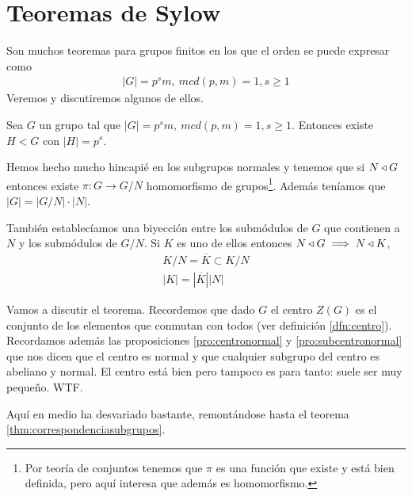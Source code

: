 
\chapter{Teoremas de Sylow}


Son muchos teoremas para grupos finitos en los que el orden se puede expresar como
\begin{align}
	|G| = p^s m,\ mcd(p, m) = 1, s \geq 1
\end{align}
Veremos y discutiremos algunos de ellos.

\begin{thm}
	Sea $G$ un grupo tal que $|G| = p^s m,\ mcd(p, m) = 1, s \geq 1$. Entonces existe $H < G$ con $|H| = p^s$.
\end{thm}

Hemos hecho mucho hincapié en los subgrupos normales y tenemos que si $N \mathbin{\triangleleft} G$ entonces existe $\pi:G \to G/N$ homomorfismo de grupos\footnote{Por teoría de conjuntos tenemos que $\pi$ es una función que existe y está bien definida, pero aquí interesa que además es homomorfismo.}. Además teníamos que $|G| = |G/N| \cdot |N|$.

También establecíamos una biyección entre los submódulos de $G$ que contienen a $N$ y los submódulos de $G/N$. Si $K$ es uno de ellos entonces $N \mathbin{\triangleleft} G \implies N \mathbin{\triangleleft} K$,
\begin{align*}
	K/N = \overline{K} \subset K/N \\
	|K| = |\overline{K}||N|
\end{align*}

Vamos a discutir el teorema. Recordemos que dado $G$ el centro $Z(G)$ es el conjunto de los elementos que conmutan con todos (ver definición \ref{dfn:centro}). Recordamos además las proposiciones \ref{pro:centronormal} y \ref{pro:subcentronormal} que nos dicen que el centro es normal y que cualquier subgrupo del centro es abeliano y normal. El centro está bien pero tampoco es para tanto: suele ser muy pequeño. WTF.


Aquí en medio ha desvariado bastante, remontándose hasta el teorema \ref{thm:correspondenciasubgrupos}.

